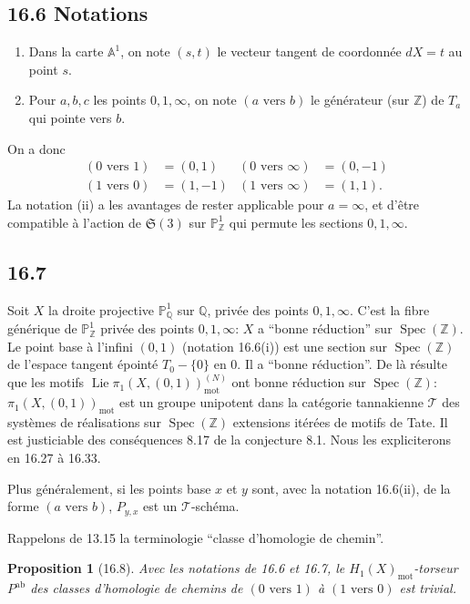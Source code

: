 \documentclass[12pt,a4paper]{article}
\theoremstyle{plain}
\newtheorem{proposition}[theorem]{Proposition}
\theoremstyle{definition}
\theoremstyle{remark}
\DeclareMathOperator{\Spec}{Spec}
\DeclareMathOperator{\Lie}{Lie}
\newcommand{\bZ}{\mathbb{Z}}
\newcommand{\bQ}{\mathbb{Q}}
\newcommand{\bP}{\mathbb{P}}
\newcommand{\bA}{\mathbb{A}}
\newcommand{\mot}{\mathrm{mot}}
\begin{document}
\subsection*{16.6 Notations}
\begin{enumerate}[label=(\roman*), nosep]
\item Dans la carte $\bA^1$, on note $(s, t)$ le vecteur tangent de coordonnée $dX = t$ au point $s$.
\item Pour $a, b, c$ les points $0, 1, \infty$, on note $(a \text{ vers } b)$ le générateur (sur $\bZ$) de $T_a$ qui pointe vers $b$.
\end{enumerate}

On a donc
\begin{align*}
(0 \text{ vers } 1) &= (0, 1) & (0 \text{ vers } \infty) &= (0, -1) \\
(1 \text{ vers } 0) &= (1, -1) & (1 \text{ vers } \infty) &= (1, 1).
\end{align*}
La notation (ii) a les avantages de rester applicable pour $a = \infty$, et d'être compatible à l'action de $\mathfrak{S}(3)$ sur $\bP^1_{\bZ}$ qui permute les sections $0, 1, \infty$.

\subsection*{16.7}

Soit $X$ la droite projective $\bP^1_{\bQ}$ sur $\bQ$, privée des points $0, 1, \infty$. C'est la fibre générique de $\bP^1_{\bZ}$ privée des points $0, 1, \infty$: $X$ a ``bonne réduction'' sur $\Spec(\bZ)$. Le point base à l'infini $(0, 1)$ (notation 16.6(i)) est une section sur $\Spec(\bZ)$ de l'espace tangent épointé $T_0 - \{0\}$ en $0$. Il a ``bonne réduction''. De là résulte que les motifs $\Lie \pi_1(X, (0, 1))_{\mot}^{(N)}$ ont bonne réduction sur $\Spec(\bZ)$: $\pi_1(X, (0, 1))_{\mot}$ est un groupe unipotent dans la catégorie tannakienne $\mathcal{T}$ des systèmes de réalisations sur $\Spec(\bZ)$ extensions itérées de motifs de Tate. Il est justiciable des conséquences 8.17 de la conjecture 8.1. Nous les expliciterons en 16.27 à 16.33.

Plus généralement, si les points base $x$ et $y$ sont, avec la notation 16.6(ii), de la forme $(a \text{ vers } b)$, $P_{y,x}$ est un $\mathcal{T}$-schéma.

Rappelons de 13.15 la terminologie ``classe d'homologie de chemin''.

\begin{proposition}[16.8]
Avec les notations de 16.6 et 16.7, le $H_1(X)_{\mot}$-torseur $P^{\text{ab}}$ des classes d'homologie de chemins de $(0 \text{ vers } 1)$ à $(1 \text{ vers } 0)$ est trivial.
\end{proposition}
\end{document}
